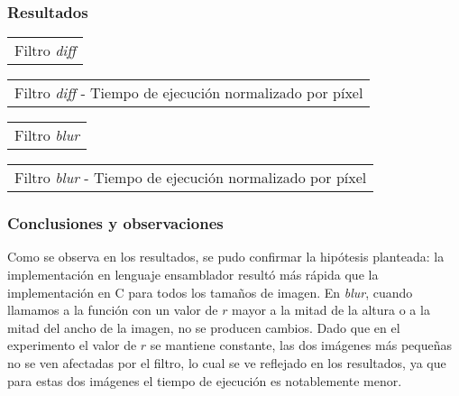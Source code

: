 		\subsubsection*{Resultados}
		   	{\centering \begin{tabular}{c}
		      {\small Filtro \emph{diff}} \\
		    \end{tabular}}

		    {\centering \begin{tabular}{c}
		      {\small Filtro \emph{diff} - Tiempo de ejecución normalizado por píxel} \\
		    \end{tabular}}

			{\centering \begin{tabular}{c}
		      {\small Filtro \emph{blur}} \\
		    \end{tabular}}

		   	{\centering \begin{tabular}{c}
		      {\small Filtro \emph{blur} - Tiempo de ejecución normalizado por píxel} \\
		    \end{tabular}}

		\subsubsection*{Conclusiones y observaciones} 
			Como se observa en los resultados, se pudo confirmar la hipótesis planteada: la implementación en lenguaje ensamblador resultó más rápida que la implementación en C para todos los tamaños de imagen.
			En \emph{blur}, cuando llamamos a la función con un valor de $r$ mayor a la mitad de la altura o a la mitad del ancho de la imagen, no se producen cambios. Dado que en el experimento el valor de $r$ se mantiene constante, las dos imágenes más pequeñas no se ven afectadas por el filtro, lo cual se ve reflejado en los resultados, ya que para estas dos imágenes el tiempo de ejecución es notablemente menor.

